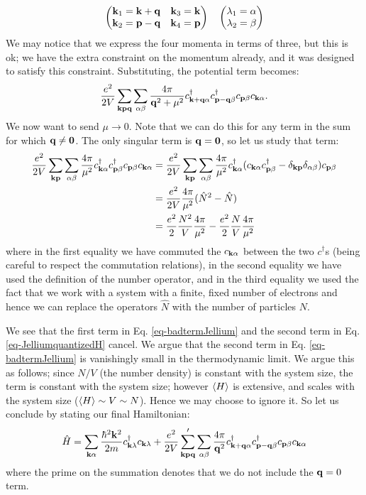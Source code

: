 \begin{equation}
    \begin{pmatrix}\mathbf{k}_1 = \mathbf{k} + \mathbf{q} & \mathbf{k}_3 = \mathbf{k} \\ \mathbf{k}_2 = \mathbf{p} - \mathbf{q} & \mathbf{k}_4 = \mathbf{p}\end{pmatrix} \quad \begin{pmatrix}\lambda_1 = \alpha \\ \lambda_2 = \beta\end{pmatrix}
\end{equation}
We may notice that we express the four momenta in terms of three, but this is ok; we have the extra constraint on the momentum already, and it was designed to satisfy this constraint. Substituting, the potential term becomes:
\begin{equation}
    \frac{e^2}{2V}\sum_{\mathbf{k}\mathbf{p}\mathbf{q}}\sum_{\alpha\beta}\frac{4\pi}{\mathbf{q}^2 + \mu^2}c^\dagger_{\mathbf{k} + \mathbf{q}\alpha}c^{\dagger}_{\mathbf{p} - \mathbf{q}\beta}c_{\mathbf{p}\beta}c_{\mathbf{k}\alpha}.
\end{equation}
We now want to send $\mu \to 0$. Note that we can do this for any term in the sum for which $\mathbf{q} \neq \mathbf{0}$. The only singular term is $\mathbf{q} = \mathbf{0}$, so let us study that term:
\begin{equation}\label{eq-badtermJellium}
    \begin{split}
        \frac{e^2}{2V}\sum_{\mathbf{k}\mathbf{p}}\sum_{\alpha\beta}\frac{4\pi}{\mu^2}c^\dagger_{\mathbf{k}\alpha}c^{\dagger}_{\mathbf{p}\beta}c_{\mathbf{p}\beta}c_{\mathbf{k}\alpha} &= \frac{e^2}{2V}\sum_{\mathbf{k}\mathbf{p}}\sum_{\alpha\beta}\frac{4\pi}{\mu^2}c^\dagger_{\mathbf{k}\alpha}(c_{\mathbf{k}\alpha}c^\dagger_{\mathbf{p}\beta} - \delta_{\mathbf{k}\mathbf{p}}\delta_{\alpha\beta})c_{\mathbf{p}\beta}
        \\ &= \frac{e^2}{2V}\frac{4\pi}{\mu^2}(\hat{N}^2 - \hat{N})
        \\ &=\frac{e^2}{2}\frac{N^2}{V}\frac{4\pi}{\mu^2} - \frac{e^2}{2}\frac{N}{V}\frac{4\pi}{\mu^2}
    \end{split}
\end{equation}
where in the first equality we have commuted the $c_{\mathbf{k}\alpha}$ between the two $c^\dag$s (being careful to respect the commutation relations), in the second equality we have used the definition of the number operator, and in the third equality we used the fact that we work with a system with a finite, fixed number of electrons and hence we can replace the operators $\hat{N}$ with the number of particles $N$. 

We see that the first term in Eq. \eqref{eq-badtermJellium} and the second term in Eq. \eqref{eq-JelliumquantizedH} cancel. We argue that the second term in Eq. \eqref{eq-badtermJellium} is vanishingly small in the thermodynamic limit. We argue this as follows; since $N/V$ (the number density) is constant with the system size, the term is constant with the system size; however $\left< H \right>$ is extensive, and scales with the system size ($\left< H \right> \sim V \sim N$). Hence we may choose to ignore it. So let us conclude by stating our final Hamiltonian:
\begin{equation}
    \hat{H} = \sum_{\mathbf{k}\alpha}\frac{\hbar^2\mathbf{k}^2}{2m}c^\dagger_{\mathbf{k}\lambda}c_{\mathbf{k}\lambda} + \frac{e^2}{2V}\sum_{\mathbf{k}\mathbf{p}\mathbf{q}}'\sum_{\alpha\beta} \frac{4\pi}{\mathbf{q}^2}c^\dagger_{\mathbf{k} + \mathbf{q}\alpha}c^{\dagger}_{\mathbf{p} - \mathbf{q}\beta}c_{\mathbf{p}\beta}c_{\mathbf{k}\alpha}
\end{equation}
where the prime on the summation denotes that we do not include the $\mathbf{q} = 0$ term.


